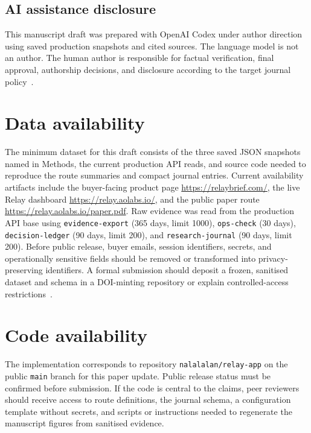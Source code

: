 \documentclass[12pt,letterpaper]{article}
\begin{document}
\subsection{AI assistance disclosure}

This manuscript draft was prepared with OpenAI Codex under author direction using saved production snapshots and cited sources. The language model is not an author. The human author is responsible for factual verification, final approval, authorship decisions, and disclosure according to the target journal policy~\cite{nature_ai_2026}.

\section{Data availability}

The minimum dataset for this draft consists of the three saved JSON snapshots named in Methods, the current production API reads, and source code needed to reproduce the route summaries and compact journal entries. Current availability artifacts include the buyer-facing product page \url{https://relaybrief.com/}, the live Relay dashboard \url{https://relay.aolabs.io/}, and the public paper route \url{https://relay.aolabs.io/paper.pdf}. Raw evidence was read from the production API base \texttt{} using \texttt{evidence-export} (365 days, limit 1000), \texttt{ops-check} (30 days), \texttt{decision-ledger} (90 days, limit 200), and \texttt{research-journal} (90 days, limit 200). Before public release, buyer emails, session identifiers, secrets, and operationally sensitive fields should be removed or transformed into privacy-preserving identifiers. A formal submission should deposit a frozen, sanitised dataset and schema in a DOI-minting repository or explain controlled-access restrictions~\cite{nature_reporting_2026}.

\section{Code availability}

The implementation corresponds to repository \texttt{nalalalan/relay-app} on the public \texttt{main} branch for this paper update. Public release status must be confirmed before submission. If the code is central to the claims, peer reviewers should receive access to route definitions, the journal schema, a configuration template without secrets, and scripts or instructions needed to regenerate the manuscript figures from sanitised evidence.
\end{document}
